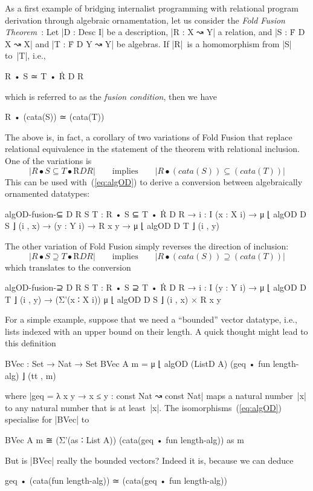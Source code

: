 As a first example of bridging internalist programming with relational program derivation through algebraic ornamentation, let us consider the \emph{Fold Fusion Theorem}~\cite[Section~6.2]{Bird-AoP}:
Let |D : Desc I| be a description, |R : X ↝ Y| a relation, and |S : Ḟ D X ↝ X| and |T : Ḟ D Y ↝ Y| be algebras.
If |R|~is a homomorphism from |S| to~|T|, i.e.,
\begin{code}
R • S ≃ T • Ṙ D R
\end{code}
which is referred to as the \emph{fusion condition}, then we have
\begin{code}
R • (cata(S)) ≃ (cata(T))
\end{code}
The above is, in fact, a corollary of two variations of Fold Fusion that replace relational equivalence in the statement of the theorem with relational inclusion.
One of the variations is
\[ |R • S ⊆ T • Ṙ D R| \qquad\text{implies}\qquad |R • (cata(S)) ⊆ (cata(T))| \]
This can be used with~(\ref{eq:algOD}) to derive a conversion between algebraically ornamented datatypes:
\begin{code}
algOD-fusion-⊆ D R S T :
  R • S ⊆ T • Ṙ D R →
  {i : I} (x : X i) → μ ⌊ algOD D S ⌋ (i , x) →
  (y : Y i) → R x y → μ ⌊ algOD D T ⌋ (i , y)
\end{code}
The other variation of Fold Fusion simply reverses the direction of inclusion:
\[ |R • S ⊇ T • Ṙ D R| \qquad\text{implies}\qquad |R • (cata(S)) ⊇ (cata(T))| \]
which translates to the conversion
\begin{code}algOD-fusion-⊇ D R S T :
  R • S ⊇ T • Ṙ D R →
  {i : I} (y : Y i) → μ ⌊ algOD D T ⌋ (i , y) →
  (Σ'(x ∶ X i)) μ ⌊ algOD D S ⌋ (i , x) × R x y
\end{code}
For a simple example, suppose that we need a ``bounded'' vector datatype, i.e., lists indexed with an upper bound on their length.
A quick thought might lead to this definition
\begin{code}
BVec : Set → Nat → Set
BVec A m = μ ⌊ algOD (ListD A) (geq • fun length-alg) ⌋ (tt , m)
\end{code}
where |geq = λ x y → x ≤ y : const Nat ↝ const Nat| maps a natural number~|x| to any natural number that is at least~|x|.
The isomorphisms~(\ref{eq:algOD}) specialise for |BVec| to
\begin{code}
BVec A m ≅ (Σ'(as ∶ List A)) (cata(geq • fun length-alg)) as m
\end{code}
But is |BVec| really the bounded vectors?
Indeed it is, because we can deduce
\begin{code}
geq • (cata(fun length-alg)) ≃ (cata(geq • fun length-alg))
\end{code}
